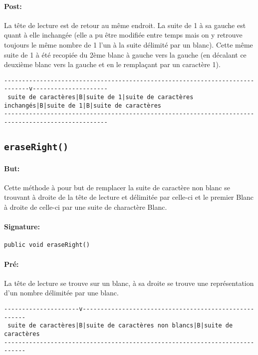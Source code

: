 \documentclass[a4paper,11pt]{article}
\begin{document}
\paragraph{Post:} La tête de lecture est de retour au même endroit. La suite de 1 à sa gauche est quant à elle inchangée (elle a pu être modifiée entre temps mais on y retrouve toujours le même nombre de 1 l'un à la suite délimité par un blanc). Cette même suite de 1 à été recopiée du 2ème blanc à gauche vers la gauche (en décalant ce deuxième blanc vers la gauche et en le remplaçant par un caractère 1). 
\begin{footnotesize}
\begin{verbatim}
-----------------------------------------------------------------------------v---------------------
 suite de caractères|B|suite de 1|suite de caractères inchangés|B|suite de 1|B|suite de caractères
---------------------------------------------------------------------------------------------------
\end{verbatim}
\end{footnotesize}
\subsection{\texttt{eraseRight()}}
\paragraph{But:} Cette méthode à pour but de remplacer la suite de caractère non blanc se trouvant à droite de la tête de lecture et délimitée par celle-ci et le premier Blanc à droite de celle-ci par une suite de charactère Blanc.
\paragraph{Signature:} \texttt{public void eraseRight()}
\paragraph{Pré:}
La tête de lecture se trouve sur un blanc, à sa droite se trouve une représentation d'un nombre délimitée par une blanc.
\begin{verbatim}
---------------------v------------------------------------------------------
 suite de caractères|B|suite de caractères non blancs|B|suite de caractères
----------------------------------------------------------------------------
\end{verbatim}
\end{document}
